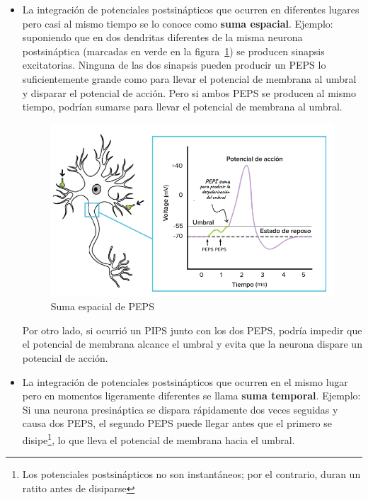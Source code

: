 \begin{itemize}
    \item La integración de potenciales postsinápticos que ocurren en diferentes lugares pero casi al mismo tiempo se lo conoce como \textbf{suma espacial}. Ejemplo:\\
    suponiendo que en dos dendritas diferentes de la misma neurona postsináptica (marcadas en verde en la figura~\ref{fig:suma_espacial_peps}) se producen sinapsis excitatorias. Ninguna de las dos sinapsis pueden producir un PEPS lo suficientemente grande como para llevar el potencial de membrana al umbral y disparar el potencial de acción. Pero si ambos PEPS se producen al mismo tiempo, podrían sumarse para llevar el potencial de membrana al umbral.
\begin{figure}[htbp!]
    \centering
    \includegraphics[width=12.0cm]{figures/PIPS_PEPS.png}
    \caption{Suma espacial de PEPS}
    \label{fig:suma_espacial_peps}
\end{figure}
Por otro lado, si ocurrió un PIPS junto con los dos PEPS, podría impedir que el potencial de membrana alcance el umbral y evita que la neurona dispare un potencial de acción. 
    \item La integración de potenciales postsinápticos que ocurren en el mismo lugar pero en momentos ligeramente diferentes se llama \textbf{suma temporal}. Ejemplo:\\
    Si una neurona presináptica se dispara rápidamente dos veces seguidas y causa dos PEPS, el segundo PEPS puede llegar antes que el primero se disipe\footnote{\footnotesize Los potenciales postsinápticos no son instantáneos; por el contrario, duran un ratito antes de disiparse}, lo que lleva el potencial de membrana hacia el umbral.
\end{itemize}
